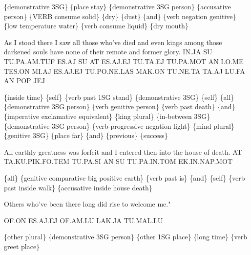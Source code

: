 \{demonstrative 3SG\} \{place stay\} \{demonstrative 3SG person\} \{accusative person\} \{VERB consume solid\} \{dry\} \{dust\} \{and\} \{verb negation genitive\} \{low temperature water\} \{verb consume liquid\} \{dry mouth\} 

 
 

 
 

As I stood there I saw all those who've died and even kings among those darkened souls have none of their remote and former glory. 
 IN.JA SU TU.PA.AM.TUF ES.AJ SU AT ES.AJ.EJ TU.TA.EJ TU.PA.MOT AN I.O.ME TES.ON MI.AJ ES.AJ.EJ TU.PO.NE.LAS MAK.ON TU.NE.TA TA.AJ LU.FA AN POP JEJ 

\{inside time\} \{self\} \{verb past 1SG stand\} \{demonstrative 3SG\} \{self\} \{all\} \{demonstrative 3SG person\} \{verb genitive person\} \{verb past death\} \{and\} \{imperative exclamative equivalent\} \{king plural\} \{in-between 3SG\} \{demonstrative 3SG person\} \{verb progressive negation light\} \{mind plural\} \{genitive 3SG\} \{place far\} \{and\} \{previous\} \{success\} 

 
 

All earthly greatness was forfeit and I entered then into the house of death.  
 AT TA.KU.PIK.FO.TEM TU.PA.SI AN SU TU.PA.IN.TOM EK.IN.NAP.MOT 

\{all\} \{genitive comparative big positive earth\} \{verb past is\} \{and\} \{self\} \{verb past inside walk\} \{accusative inside house death\} 

 
 

Others who’ve been there long did rise to welcome me." 

OF.ON ES.AJ.EJ OF.AM.LU LAK.JA TU.MAL.LU 

\{other plural\} \{demonstrative 3SG person\} \{other 1SG place\} \{long time\} \{verb greet place\} 




